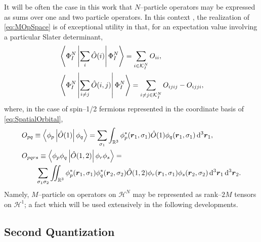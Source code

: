 It will be often the case in this work that $N$--particle operators may be expressed as sums over one and
two particle operators. In this context , the realization of \cref{eq:MOpSpace} is of exceptional utility in that,
for an expectation value involving a particular Slater determinant,
\begin{subequations}
  \label{eq:SlaterCondon}
\begin{align}
  &\left\langle \Phi^N_I \left\vert \sum_i\hat{O}(i) \right\vert \Phi^N_I \right\rangle = \sum_{i\in\mathcal{K}^N_I} O_{ii},\\
  &\left\langle \Phi^N_I \left\vert \sum_{i\neq j} \hat{O}(i,j) \right\vert \Phi^N_I \right\rangle = 
    \sum_{i\neq j \in\mathcal{K}^N_I} O_{ijij} - O_{ijji},
\end{align}
\end{subequations}
where, in the case of spin--1/2 fermions represented in the coordinate basis of \cref{eq:SpatialOrbital},
\begin{subequations}
  \label{eq:DiracInts}
\begin{align}
  &O_{pq} \equiv \left\langle \phi_p \left\vert \hat{O}(1) \right\vert \phi_q \right\rangle = 
    \sum_{\sigma_1} \int_{\mathbb{R}^3} \phi_p^*(\boldsymbol{r}_1,\sigma_1) \hat{O}(1) \phi_q(\boldsymbol{r}_1,\sigma_1) \,\mathrm{d}^3 \boldsymbol{r}_1,\\
  &O_{pqrs} \equiv \left\langle \phi_p \phi_q  \left\vert \hat{O}(1,2) \right\vert \phi_r \phi_s \right\rangle = \nonumber \\ &\qquad
    \sum_{\sigma_1 \sigma_2} \int\mkern-12mu\int_{\mathbb{R}^3} 
      \phi_p^*(\boldsymbol{r}_1,\sigma_1) \phi_q^*(\boldsymbol{r}_2,\sigma_2) \hat{O}(1,2) 
      \phi_r(\boldsymbol{r}_1,\sigma_1) \phi_s(\boldsymbol{r}_2,\sigma_2) \,\mathrm{d}^3 \boldsymbol{r}_1 \,\mathrm{d}^3 \boldsymbol{r}_2.
\end{align}
\end{subequations}
Namely, $M$--particle on operators on $\mathcal{H}^N$ may be represented as rank--$2M$ tensors on $\mathcal{H}^1$; a fact which will
be used extensively in the following developments.


\subsection{Second Quantization}
\label{sec:SQ}

